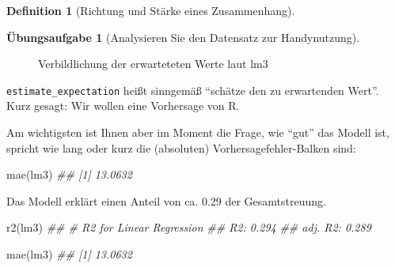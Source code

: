 \documentclass[
  a4paper,
  DIV=11]{scrreprt}
\newenvironment{Shaded}{\begin{snugshade}}{\end{snugshade}}
\newcommand{\DocumentationTok}[1]{\textcolor[rgb]{0.37,0.37,0.37}{\textit{#1}}}
\newcommand{\FunctionTok}[1]{\textcolor[rgb]{0.28,0.35,0.67}{#1}}
\newcommand{\NormalTok}[1]{\textcolor[rgb]{0.00,0.23,0.31}{#1}}
\theoremstyle{definition}
\newtheorem{exercise}{Übungsaufgabe}[chapter]
\theoremstyle{definition}
\theoremstyle{definition}
\newtheorem{definition}{Definition}[chapter]
\theoremstyle{remark}
\begin{document}
\begin{definition}[Richtung und Stärke eines
Zusammenhang]
\begin{exercise}[Analysieren Sie den Datensatz zur
Handynutzung]
\begin{figure}[H]

\caption{\label{fig-lm3}Verbildlichung der erwarteteten Werte laut lm3}

\end{figure}%

\texttt{estimate\_expectation} heißt sinngemäß ``schätze den zu
erwartenden Wert''. Kurz gesagt: Wir wollen eine Vorhersage von R.

Am wichtigsten ist Ihnen aber im Moment die Frage, wie ``gut'' das
Modell ist, spricht wie lang oder kurz die (absoluten)
Vorhersagefehler-Balken sind:

\begin{Shaded}
\begin{Highlighting}[]
\FunctionTok{mae}\NormalTok{(lm3)}
\DocumentationTok{\#\# [1] 13.0632}
\end{Highlighting}
\end{Shaded}

Das Modell erklärt einen Anteil von ca. 0.29 der Gesamtstreuung.

\begin{Shaded}
\begin{Highlighting}[]
\FunctionTok{r2}\NormalTok{(lm3)}
\DocumentationTok{\#\# \# R2 for Linear Regression}
\DocumentationTok{\#\#        R2: 0.294}
\DocumentationTok{\#\#   adj. R2: 0.289}
\end{Highlighting}
\end{Shaded}

\begin{Shaded}
\begin{Highlighting}[]
\FunctionTok{mae}\NormalTok{(lm3)}
\DocumentationTok{\#\# [1] 13.0632}
\end{Highlighting}
\end{Shaded}


\end{exercise}
\end{definition}
\end{document}
